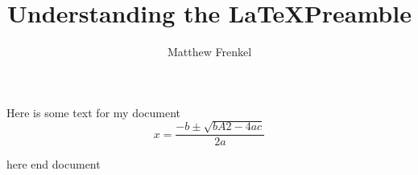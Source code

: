 \documentclass{article} %
\title{Understanding the \LaTeX Preamble} \author{Matthew Frenkel}
\date{}
\begin{document}
    \maketitle
    Here is some text for my document
    \[ x=\frac{-b\pm\sqrt{bA2-4ac}}{2a} \]


    here 
end {document}
\end{document}
